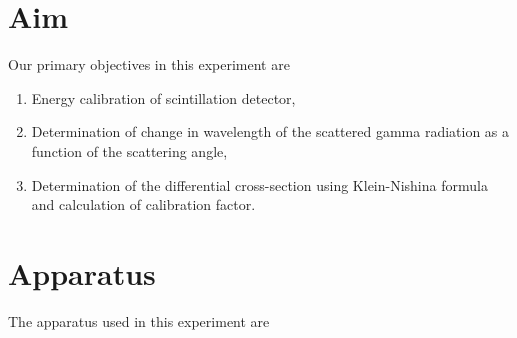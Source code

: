 \documentclass[%
 reprint,
nofootinbib,
 amsmath,amssymb,
 aps,
floatfix,
]{revtex4-2}
\begin{document}
\section{Aim}
    Our primary objectives in this experiment are
    \begin{enumerate}
        \item Energy calibration of scintillation detector,
        \item Determination of change in wavelength of the scattered gamma radiation as a function of the scattering angle,
        \item Determination of the differential cross-section using Klein-Nishina formula and calculation of calibration factor.
    \end{enumerate}
    
\section{Apparatus}
    The apparatus used in this experiment are
\end{document}
